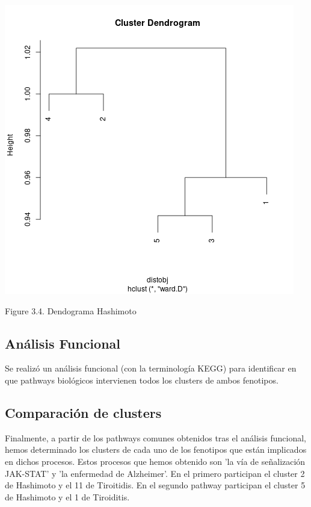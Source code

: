 \begin{center}
 
    \includegraphics[scale=0.5]{figures/comunidades_hashimoto.png}
    
    Figure 3.4. Dendograma Hashimoto
\end{center}

\subsection*{Análisis Funcional}
Se realizó un análisis funcional (con la terminología KEGG) para identificar en que pathways biológicos intervienen todos los clusters de ambos fenotipos.

\subsection*{Comparación de clusters}
Finalmente, a partir de los pathways comunes obtenidos tras el análisis funcional, hemos determinado los clusters de cada uno de los fenotipos que están implicados en dichos procesos. Estos procesos que hemos obtenido son 'la vía de señalización JAK-STAT' y 'la enfermedad de Alzheimer'. En el primero participan el cluster 2 de Hashimoto y el 11 de Tiroitidis. En el segundo pathway participan el cluster 5 de Hashimoto y el 1 de Tiroiditis.